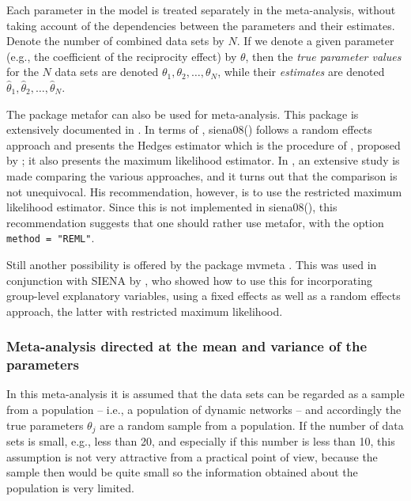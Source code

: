\documentclass[a4paper,fleqn,11pt]{article}
\newcommand{\+}{\, + \,}
\newcommand{\sfn}[1]{\textsf{#1}}
\newcommand{\SI}{{\sf SIENA }}
\begin{document}
Each parameter in the model is treated separately
in the meta-analysis, without taking account of the
dependencies between the parameters and their estimates.
Denote the number of combined data sets by $N$.
If we denote a given parameter (e.g., the
coefficient of the reciprocity effect) by $\theta$,
then the \emph{true parameter values} for the
$N$ data sets are denoted $\theta_1, \theta_2, \ldots, \theta_N$,
while their \emph{estimates} are denoted
 $\hat\theta_1, \hat\theta_2, \ldots, \hat\theta_N$.
 \bigskip

The package \sfn{metafor} can also be used for meta-analysis.
This package is extensively documented in \citet{Viechtbauer2010}.
In terms of \citet{Viechtbauer2010}, \sfn{siena08()} follows a
random effects approach and presents the Hedges estimator
which is the procedure of \citet{SnijdersBaerveldt03}, proposed
by \citet{Cochran54}; it also presents the maximum likelihood
estimator.
In \citet{Viechtbauer2005}, an extensive study is made comparing
the various approaches, and it turns out that the comparison is
not unequivocal. His recommendation, however, is to use the
restricted maximum likelihood estimator.
Since this is not implemented in \sfn{siena08()}, this recommendation
suggests that one should rather use  \sfn{metafor}, with the
option \texttt{method = "REML"}.

Still another possibility is offered by the package \sfn{mvmeta}
\citep{Gasparrini2012}.
This was used in conjunction with \SI by
\citet{An2015}, who showed how to use this for incorporating
group-level explanatory variables, using a fixed effects
as well as a random effects approach, the latter with
restricted maximum likelihood.

\subsubsection{Meta-analysis directed at the mean
               and variance of the parameters}

In this meta-analysis it is assumed that the data sets can be
regarded as a sample from a population -- i.e., a population
of dynamic networks -- and accordingly the true parameters
$\theta_j$  are a random sample from a population.
If the number of data sets is small, e.g., less than 20,
and especially if this number is less than 10,
this assumption is not very attractive from a practical point of view,
because the sample then would be quite small
so the information obtained about the population is very limited.
\end{document}
